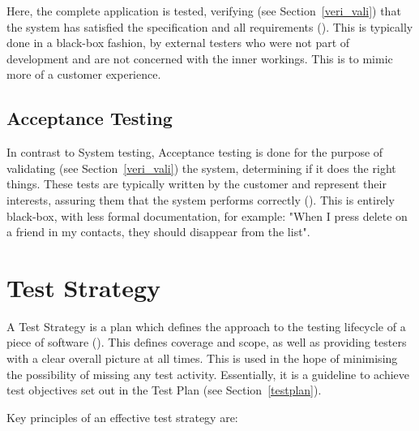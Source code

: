 \documentclass[12pt]{article}
\begin{document}
Here, the complete application is tested, verifying (see Section~\ref{veri_vali}) that the system has satisfied the specification and all requirements (). This is typically done in a black-box fashion, by external testers who were not part of development and are not concerned with the inner workings. This is to mimic more of a customer experience.


\subsection{Acceptance Testing}

In contrast to System testing, Acceptance testing is done for the purpose of validating (see Section~\ref{veri_vali}) the system, determining if it does the right things. These tests are typically written by the customer and represent their interests, assuring them that the system performs correctly (). This is entirely black-box, with less formal documentation, for example: "When I press delete on a friend in my contacts, they should disappear from the list".



\section{Test Strategy} \label{test_strategy}

A Test Strategy is a plan which defines the approach to the testing lifecycle of a piece of software (). This defines coverage and scope, as well as providing testers with a clear overall picture at all times. This is used in the hope of minimising the possibility of missing any test activity. Essentially, it is a guideline to achieve test objectives set out in the Test Plan (see Section~\ref{testplan}).

Key principles of an effective test strategy are:
\end{document}
